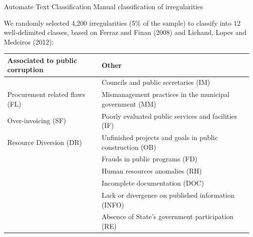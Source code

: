 \documentclass[handout,t,usenames,dvipsnames]{beamer}
\begin{document}
\begin{frame}{Automate Text Classification}
\justifying
{\color{emap-azul-escuro}\large Manual classification of irregularities}
\vspace{0.5em}
\small

We randomly selected 4,200 irregularities (5\% of the sample) to classify into 12 well-delimited classes, based on Ferraz and Finan (2008)\nocite{Eleicoes} and Lichand, Lopes and Medeiros (2012)\nocite{Saude}:
\begin{table}
\footnotesize
\centering
    \begin{tabular}{ | p{5cm}| p{5cm} |}
    \hline
    Associated to public corruption & Other \\ \hline
     {} & \scriptsize{Councils and public secretaries (IM)}\\
     Procurement related flaws (FL) & \scriptsize{Mismanagement practices in the municipal government (MM)}\\
     Over-invoicing (SF) & \scriptsize{Poorly evaluated public services and facilities (IF)}\\
     Resource Diversion (DR) & \scriptsize{Unfinished projects and goals in public construction (OB)}\\ 
     {} & \scriptsize{Frauds in public programs (FD)}\\
     {} & \scriptsize{Human resources anomalies (RH)}\\
     {} & \scriptsize{Incomplete documentation (DOC)}\\
     {} & \scriptsize{Lack or divergence on published information (INFO)}\\
     {} & \scriptsize{Absence of State's government participation (RE)}\\ \hline
    \end{tabular}
\end{table}


\vspace{1em}
 
\end{frame}
\end{document}
